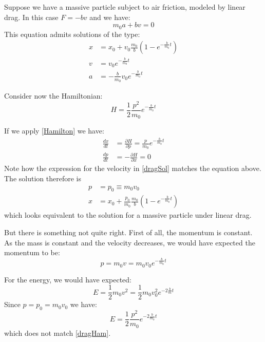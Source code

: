 \documentclass[aps,pra,10pt,twocolumn,floatfix,nofootinbib]{revtex4-1}
\theoremstyle{definition}
\begin{document}
Suppose we have a massive particle subject to air friction, modeled by linear drag. In this case $F=-bv$ and we have:
\begin{equation}
\label{dragEq}
m_0a+bv=0
\end{equation}
This equation admits solutions of the type:
\begin{equation}
\begin{aligned}
x &= x_0+v_0\frac{m_0}{b}(1-e^{-\frac{b}{m_0}t}) \\
v &= v_0 e^{-\frac{b}{m_0}t} \\
a &= -\frac{b}{m_0} v_0 e^{-\frac{b}{m_0}t}
\end{aligned}
\label{dragSol}
\end{equation}

Consider now the Hamiltonian:
\begin{equation}
\label{dragHam}
H = \frac{1}{2} \frac{p^2}{m_0} e^{-\frac{b}{m_0}t}
\end{equation}

If we apply \eqref{Hamilton} we have:
\begin{equation*}
\begin{aligned}
\frac{dx}{dt} &= \frac{\partial H}{\partial p} = \frac{p}{m_0} e^{-\frac{b}{m_0}t} \\ 
\frac{dp}{dt} &= - \frac{\partial H}{\partial x} = 0
\end{aligned}
\end{equation*}
Note how the expression for the velocity in \eqref{dragSol} matches the equation above. The solution therefore is
\begin{equation}
\begin{aligned}
p &= p_0 \equiv m_0 v_0 \\
x &= x_0+\frac{p_0}{m_0}\frac{m_0}{b}(1-e^{-\frac{b}{m_0}t})
\end{aligned}
\label{dragHamSol}
\end{equation}
which looks equivalent to the solution for a massive particle under linear drag.

But there is something not quite right. First of all, the momentum is constant. As the mass is constant and the velocity decreases, we would have expected the momentum to be:
\begin{equation}
\label{dragExpMom}
p = m_0 v = m_0 v_0 e^{-\frac{b}{m_0}t}
\end{equation}

For the energy, we would have expected:
\begin{equation*}
E = \frac{1}{2} m_0 v^2 = \frac{1}{2} m_0 v_0^2 e^{-2\frac{b}{m}t}
\end{equation*}
Since $p = p_0 = m_0 v_0$ we have:
\begin{equation*}
E = \frac{1}{2} \frac{p^2}{m_0} e^{-2\frac{b}{m_0}t}
\end{equation*}
which does not match \eqref{dragHam}.
\end{document}
